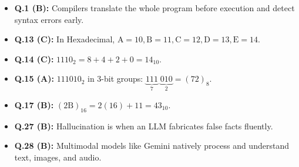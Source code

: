 \begin{expbox}
\begin{itemize}[leftmargin=5mm]
    \item \textbf{Q.1 (B):} Compilers translate the whole program before execution and detect syntax errors early.
    \item \textbf{Q.13 (C):} In Hexadecimal, $\text{A}=10, \text{B}=11, \text{C}=12, \text{D}=13, \text{E}=14$.
    \item \textbf{Q.14 (C):} $1110_2 = 8 + 4 + 2 + 0 = 14_{10}$.
    \item \textbf{Q.15 (A):} $111010_2$ in 3-bit groups: $\underbrace{111}_{7}\;\underbrace{010}_{2} = (72)_8$.
    \item \textbf{Q.17 (B):} $(2\text{B})_{16} = 2(16) + 11 = 43_{10}$.
    \item \textbf{Q.27 (B):} Hallucination is when an LLM fabricates false facts fluently.
    \item \textbf{Q.28 (B):} Multimodal models like Gemini natively process and understand text, images, and audio.
\end{itemize}
\end{expbox}

\newpage
